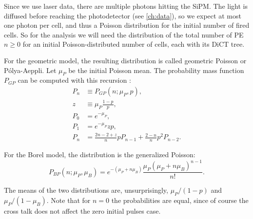 \begin{figure}
    

    
\end{figure}

Since we use laser data, there are multiple photons hitting the SiPM. The light
is diffused before reaching the photodetector (see \autoref{ch:data}), so we
expect at most one photon per cell, and thus a Poisson distribution for the
initial number of fired cells. So for the analysis we will need the
distribution of the total number of PE $n \ge 0$ for an initial
Poisson-distributed number of cells, each with its DiCT tree.

For the geometric model, the resulting distribution is called geometric Poisson
or Pólya-Aeppli. Let $\mu_P$ be the initial Poisson mean. The probability mass
function $P_{GP}$ can be computed with this recursion \cite[5]{nuel2008}:
%
\begin{align}
    P_n &\equiv P_{GP}(n;\mu_P,p), \\
    z &\equiv \mu_P \frac{1-p}p, \\
    P_0 &= e^{-\mu_P}, \\
    P_1 &= e^{-\mu_P} zp, \\
    P_n &= \frac{2n - 2 + z}n p P_{n-1} + \frac{2-n}n p^2 P_{n-2}.
    \label{eq:geompoisson}
\end{align}

For the Borel model, the distribution is the generalized Poisson:
%
\begin{equation}
    P_{BP}(n;\mu_P,\mu_B)
    = e^{-(\mu_P + n\mu_B)} \frac {\mu_P(\mu_P + n\mu_B)^{n-1}} {n!}.
    \label{eq:genpoisson}
\end{equation}

The means of the two distributions are, unsurprisingly, $\mu_P/(1-p)$ and
$\mu_P/(1-\mu_B)$. Note that for $n = 0$ the probabilities are equal, since
of course the cross talk does not affect the zero initial pulses case.

